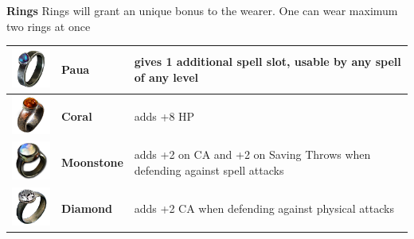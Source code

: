 \textbf{Rings} Rings will grant an unique bonus to the wearer. One can wear maximum two rings at once \\

\begin{tabular}{m{2cm}m{3cm}m{5cm} } \hline
	\includegraphics[width=2cm]{../Pictures/Gameplay/Items/Wearables/Rings/Paua_ring_icon.png} & \textbf{Paua} & gives 1 additional spell slot, usable by any spell of any level \\ \hline
	\includegraphics[width=2cm]{../Pictures/Gameplay/Items/Wearables/Rings/Coral_ring_icon.png} & \textbf{Coral} & adds +8 HP \\ \hline
	\includegraphics[width=2cm]{../Pictures/Gameplay/Items/Wearables/Rings/Moonstone_ring_icon.png} & \textbf{Moonstone} & adds +2 on CA and +2 on Saving Throws when defending against spell attacks \\ \hline
	\includegraphics[width=2cm]{../Pictures/Gameplay/Items/Wearables/Rings/Diamond_ring_icon.png} & \textbf{Diamond} & adds +2 CA when defending against physical attacks \\ \hline
\end{tabular}

\pagebreak 